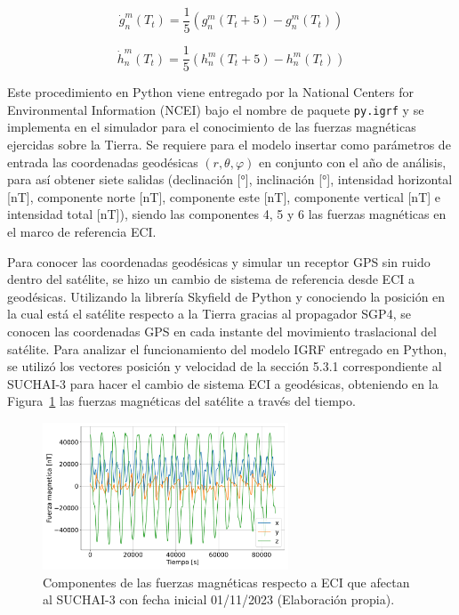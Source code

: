 \begin{equation}
	\dot{g}_n^m (T_t) = \frac{1}{5} \left( g_n^m (T_t+5) - g_n^m (T_t) \right)
\end{equation}

\begin{equation}
	\dot{h}_n^m (T_t) = \frac{1}{5} \left( h_n^m (T_t+5) - h_n^m (T_t) \right)
\end{equation}

Este procedimiento en Python viene entregado por la National Centers for Environmental Information (NCEI) \cite{ref40} bajo el nombre de paquete \texttt{py.igrf} y se implementa en el simulador para el conocimiento de las fuerzas magnéticas ejercidas sobre la Tierra. Se requiere para el modelo insertar como parámetros de entrada las coordenadas geodésicas $(r, \theta, \varphi)$ en conjunto con el año de análisis, para así obtener siete salidas (declinación [°], inclinación [°], intensidad horizontal [nT], componente norte [nT], componente este [nT], componente vertical [nT] e intensidad total [nT]), siendo las componentes 4, 5 y 6 las fuerzas magnéticas en el marco de referencia ECI.

Para conocer las coordenadas geodésicas y simular un receptor GPS sin ruido dentro del satélite, se hizo un cambio de sistema de referencia desde ECI a geodésicas. Utilizando la librería Skyfield de Python y conociendo la posición en la cual está el satélite respecto a la Tierra gracias al propagador SGP4, se conocen las coordenadas GPS en cada instante del movimiento traslacional del satélite. Para analizar el funcionamiento del modelo IGRF entregado en Python, se utilizó los vectores posición y velocidad de la sección 5.3.1 correspondiente al SUCHAI-3 para hacer el cambio de sistema ECI a geodésicas, obteniendo en la Figura~\ref{fig:bb} las fuerzas magnéticas del satélite a través del tiempo.


\begin{figure}[h]
	\centering    
	\includegraphics[width=0.65\textwidth]{bb.pdf}
	\caption{Componentes de las fuerzas magnéticas respecto a ECI que afectan al SUCHAI-3 con fecha inicial 01/11/2023 (Elaboración propia).}
	\label{fig:bb}
\end{figure}

